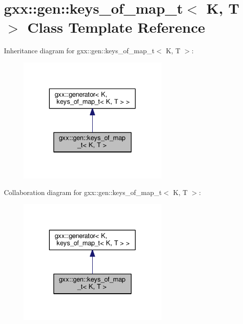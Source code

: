\hypertarget{classgxx_1_1gen_1_1keys__of__map__t}{}\section{gxx\+:\+:gen\+:\+:keys\+\_\+of\+\_\+map\+\_\+t$<$ K, T $>$ Class Template Reference}
\label{classgxx_1_1gen_1_1keys__of__map__t}


Inheritance diagram for gxx\+:\+:gen\+:\+:keys\+\_\+of\+\_\+map\+\_\+t$<$ K, T $>$\+:\nopagebreak
\begin{figure}[H]
\begin{center}
\leavevmode
\includegraphics[width=212pt]{classgxx_1_1gen_1_1keys__of__map__t__inherit__graph}
\end{center}
\end{figure}


Collaboration diagram for gxx\+:\+:gen\+:\+:keys\+\_\+of\+\_\+map\+\_\+t$<$ K, T $>$\+:\nopagebreak
\begin{figure}[H]
\begin{center}
\leavevmode
\includegraphics[width=212pt]{classgxx_1_1gen_1_1keys__of__map__t__coll__graph}
\end{center}
\end{figure}

